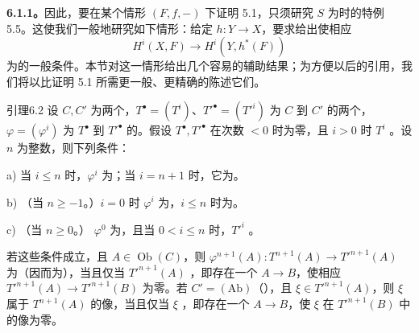 \textbf{6.1.1。}因此，要在某个情形 $(F,f,-)$ 下证明 5.1，只须研究 $S$ 为时的特例 5.5。这使我们一般地研究如下情形：给定 $h:Y\to X$，要求给出使相应
\[
H^i(X,F)\longrightarrow H^i(Y,h^*(F))
\]
为的一般条件。本节对这一情形给出几个容易的辅助结果；为方便以后的引用，我们将以比证明 5.1 所需更一般、更精确的陈述它们。

\begin{SGAresult}{引理}{6.2}
设 $C,C'$ 为两个，$T^\bullet=(T^i)$、$T'^\bullet=(T'^i)$ 为 $C$ 到 $C'$ 的两个，$\varphi=(\varphi^i)$ 为 $T^\bullet$ 到 $T'^\bullet$ 的。假设 $T^\bullet,T'^\bullet$ 在次数 $<0$ 时为零，且 $i>0$ 时 $T^i$ 。设 $n$ 为整数，则下列条件：

 a) 当 $i\leq n$ 时，$\varphi^i$ 为；当 $i=n+1$ 时，它为。

 b) （当 $n\geq-1$。）$i=0$ 时 $\varphi^i$ 为，$i\leq n$ 时为。

 c) （当 $n\geq0$。） $\varphi^0$ 为，且当 $0<i\leq n$ 时，$T'^i$ 。

若这些条件成立，且 $A\in\operatorname{Ob}(C)$，则 $\varphi^{n+1}(A):T^{n+1}(A)\to T'^{n+1}(A)$ 为（因而为），当且仅当 $T'^{n+1}(A)$ ，即存在一个 $A\to B$，使相应 $T'^{n+1}(A)\to T'^{n+1}(B)$ 为零。若 $C'=(\mathrm{Ab})$（），且 $\xi\in T'^{n+1}(A)$，则 $\xi$ 属于 $T^{n+1}(A)$ 的像，当且仅当 $\xi$ ，即存在一个 $A\to B$，使 $\xi$ 在 $T'^{n+1}(B)$ 中的像为零。
\end{SGAresult}


